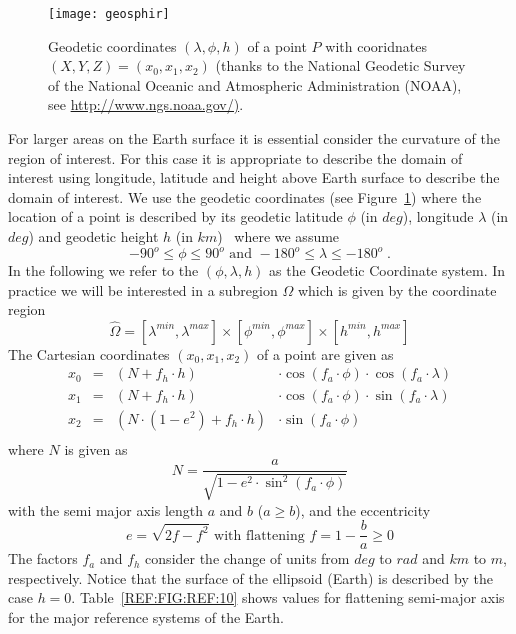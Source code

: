 \begin{figure}[t]
    \centering\texttt{[image: geosphir]}
    \caption{Geodetic coordinates  $( \lambda, \phi,h)$ of a point $P$ with 
cooridnates $(X,Y,Z)=(x_0,x_1,x_2)$ (thanks to the National Geodetic Survey of the National Oceanic and Atmospheric Administration (NOAA), 
see \url{http://www.ngs.noaa.gov/)}.
}
    \label{fig:geodeticDomain}
\end{figure}
For larger areas on the Earth surface it is essential consider the curvature of the region of interest. For this case 
it is appropriate to describe the domain of interest using longitude, latitude and height above Earth surface to describe 
the domain of interest. We use the geodetic coordinates (see Figure~\ref{fig:geodeticDomain}) where the location of a point 
is described by its geodetic latitude $\phi$ (in $deg$), longitude 
$\lambda$ (in $deg$) and geodetic height $h$ (in $km$)~\cite{Featherstone2008a} where we assume
\begin{equation}
  -90^o \le \phi \le 90^o \mbox{ and } -180^o \le \lambda \le -180^o \;.
\end{equation} 
In the following we refer to the $(\phi, \lambda, h)$ as the Geodetic Coordinate system.
In practice we will be interested in a subregion $\Omega$ which is given by the coordinate region   
\begin{equation} \label{REF:EQU:INTRO 8b}
\widehat{\Omega} = 
 [\lambda^{min}, \lambda^{max}] \times [\phi^{min}, \phi^{max}] \times
 [h^{min}, h^{max}] 
\end{equation} 
The Cartesian coordinates $(x_0,x_1,x_2)$ of a point are given as 
\begin{equation}
\begin{array}{rcll}
   x_0 & = &  (N + f_{h}  \cdot  h) & \cdot \cos(f_{a} \cdot  \phi) \cdot  \cos(f_{a} \cdot  \lambda) \\
   x_1 & = &  (N + f_{h}  \cdot  h) & \cdot  \cos(f_{a} \cdot  \phi) \cdot  \sin(f_{a} \cdot  \lambda) \\
   x_2 & = &  (N \cdot (1-e^2) + f_{h}  \cdot  h ) & \cdot  \sin(f_{a} \cdot  \phi)\\
\end{array}
\label{equ:geodetic:1}
\end{equation} 
where $N$ is given as 
\begin{equation}
 N = \frac{a}{\sqrt{1- e^2 \cdot \sin^2(f_{a} \cdot  \phi) }}
\label{equ:geodetic:2}
\end{equation}
with the semi major axis length $a$ and $b$ ($ a \ge b$), and the eccentricity 
\begin{equation} \label{equ:ref:coordinates:100}
e = \sqrt{2f - f^2} \mbox{ with flattening } f = 1-\frac{b}{a} \ge 0
\label{equ:geodetic:3}
\end{equation}
The factors $f_{a}$ and $f_{h}$ consider the change of units from 
$deg$ to $rad$ and $km$ to $m$, respectively.
Notice that the surface of the ellipsoid (Earth) is described by the case $h=0$.  Table~\ref{REF:FIG:REF:10}
shows values for  flattening semi-major axis for the major reference systems of the Earth.

